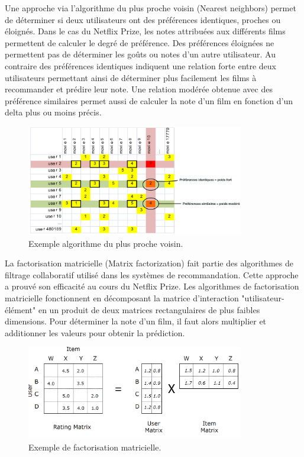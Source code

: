 \vspace{5mm}

Une approche via l’algorithme du plus proche voisin (Nearest neighbors) permet de déterminer si deux utilisateurs ont des préférences identiques, proches ou éloignés. Dans le cas du Netflix Prize, les notes attribuées aux différents films permettent de calculer le degré de préférence. Des préférences éloignées ne permettent pas de déterminer les goûts ou notes d’un autre utilisateur. Au contraire des préférences identiques indiquent une relation forte entre deux utilisateurs permettant ainsi de déterminer plus facilement les films à recommander et prédire leur note. Une relation modérée obtenue avec des préférence similaires permet aussi de calculer la note d’un film en fonction d’un delta plus ou moins précis. 

\vspace{5mm}

\begin{figure}[htp]
  \centering
  \includegraphics[width=95mm]{./src_img/procheVoisin}
  \caption{Exemple algorithme du plus proche voisin.}
  \label{fig:trois-deux}
\end{figure}

\vspace{5mm}

La factorisation matricielle (Matrix factorization) fait partie des algorithmes de filtrage collaboratif utilisé dans les systèmes de recommandation. Cette approche a prouvé son efficacité au cours du Netflix Prize. Les algorithmes de factorisation matricielle fonctionnent en décomposant la matrice d'interaction "utilisateur-élément" en un produit de deux matrices rectangulaires de plus faibles dimensions. Pour déterminer la note d'un film, il faut alors multiplier et additionner les valeurs pour obtenir la prédiction.

\vspace{5mm}

\begin{figure}[htp]
  \centering
  \includegraphics[width=95mm]{./src_img/matrix}
  \caption{Exemple de factorisation matricielle.}
  \label{fig:trois-trois}
\end{figure}

